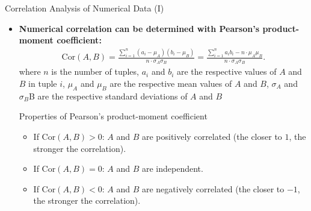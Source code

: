 \begin{frame}{Correlation Analysis of Numerical Data (I)}
	\begin{itemize}
		\item \textbf{Numerical correlation can be determined with
				      {\color{airforceblue}Pearson's product-moment coefficient}:}
		      \begin{align*}
			      \text{Cor}(A, B) = \frac{\sum_{i=1}^{n}
				      (a_i-\mu_{A})(b_i-\mu_{B})}{n\cdot\sigma_{A}\sigma_{B}} =
			      \frac{\sum_{i=1}^{n} a_i b_i -n\cdot\mu_{A}\mu_{B}}{n\cdot
				      \sigma_{A}\sigma_{B}}.
		      \end{align*}
		      where $n$ is the number of tuples, $a_i$ and $b_i$ are the
		      respective values of $A$ and $B$ in tuple $i$,
		      $\mu_A$ and $\mu_B$ are the respective mean values of $A$ and $B$,
		      $\sigma_{A}$ and $\sigma_{B}$B are the respective standard
		      deviations of $A$ and $B$

		      \vspace*{5mm}

		      \begin{block}{Properties of Pearson's product-moment coefficient}
			      \begin{itemize}
				      \item If $\text{Cor}(A, B) > 0$: $A$ and $B$ are positively
				            correlated (the closer to $1$, the stronger the correlation).
				      \item If $\text{Cor}(A, B) = 0$: $A$ and $B$ are independent.
				      \item If $\text{Cor}(A, B) < 0$: $A$ and $B$ are negatively correlated (the closer to $-1$, the stronger the correlation).

			      \end{itemize}
		      \end{block}
	\end{itemize}
\end{frame}

